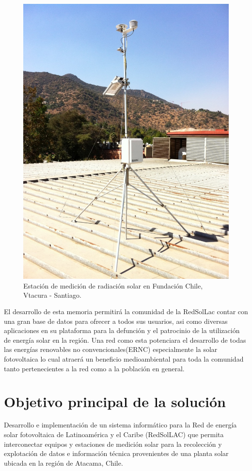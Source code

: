 \begin{figure}[h!]
        \centering
        \includegraphics[scale=0.2]{images/estacionMedicionFch}
        \caption{Estación de medición de radiación solar en Fundación Chile, Vtacura - Santiago.}
\end{figure}

El desarrollo de esta memoria permitirá la comunidad de la RedSolLac contar con una gran base de datos para ofrecer a todos sus usuarios, asi como diversas aplicaciones en su plataforma para la defunción y el patrocinio de la utilización de energía solar en la región. Una red como esta potenciara el desarrollo de todas las energías renovables no convencionales(ERNC) especialmente la solar fotovoltaica lo cual atraerá un beneficio medioambiental para toda la comunidad tanto pertenecientes a la red como a la población en general.

\section{Objetivo principal de la solución}
Desarrollo e implementación de un sistema informático para la Red de energía solar fotovoltaica de Latinoamérica y el Caribe (RedSolLAC) que permita interconectar equipos y estaciones de medición solar para la recolección y explotación de datos e información técnica provenientes de una planta solar ubicada en la región de Atacama, Chile.

